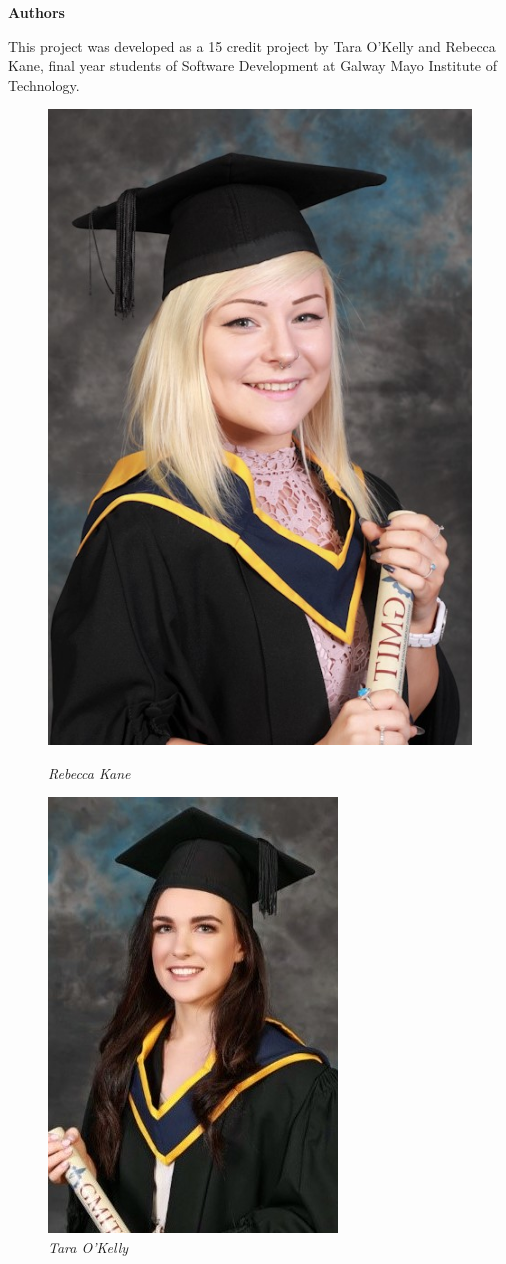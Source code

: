 \centerline{\textbf{Authors}}
\noindent This project was developed as a 15 credit project by Tara O'Kelly and Rebecca Kane, final year students of Software Development at Galway Mayo Institute of Technology. 
\begin{figure}[b]
\centering
\begin{minipage}{.5\textwidth}
  \centering
  \includegraphics[width=.47\linewidth]{img/rebecca.jpg}
  \captionsetup{labelformat=empty}
  \caption{\textit{Rebecca Kane}}
\end{minipage}%
\begin{minipage}{.5\textwidth}
  \centering
  \includegraphics[width=.47\linewidth]{img/tara.jpg}
  \captionsetup{labelformat=empty}
  \caption{\textit{Tara O'Kelly}}
\end{minipage}
\end{figure}


